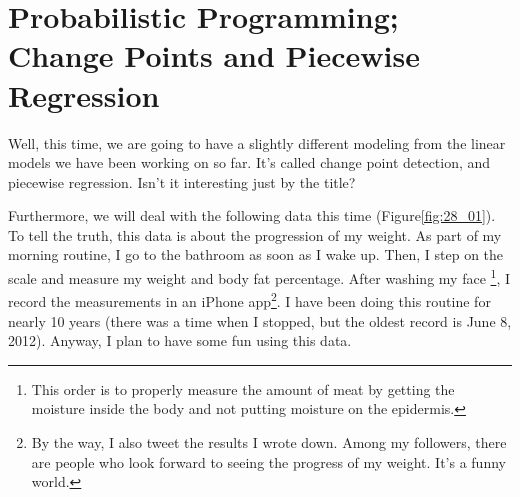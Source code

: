 \documentclass{ltjsbook}
\begin{document}
\chapter{Probabilistic Programming; Change Points and Piecewise Regression}
\label{x28_ChangePoint}
Well, this time, we are going to have a slightly different modeling from the linear models we have been working on so far. It's called change point detection, and piecewise regression. Isn't it interesting just by the title?

Furthermore, we will deal with the following data this time (Figure\ref{fig:28_01}). To tell the truth, this data is about the progression of my weight.
As part of my morning routine, I go to the bathroom as soon as I wake up. Then, I step on the scale and measure my weight and body fat percentage. After washing my face \footnote {This order is to properly measure the amount of meat by getting the moisture inside the body and not putting moisture on the epidermis.}, I record the measurements in an iPhone app\footnote {By the way, I also tweet the results I wrote down. Among my followers, there are people who look forward to seeing the progress of my weight. It's a funny world. }.  I have been doing this routine for nearly 10 years (there was a time when I stopped, but the oldest record is June 8, 2012). Anyway, I plan to have some fun using this data.



\end{document}

